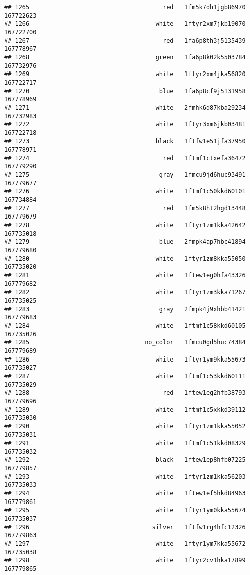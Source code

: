 \documentclass[
]{article}
\begin{document}
\begin{verbatim}
## 1265                                     red   1fm5k7dh1jgb86970 167722623
## 1266                                   white   1ftyr2xm7jkb19070 167722700
## 1267                                     red   1fa6p8th3j5135439 167778967
## 1268                                   green   1fa6p8k02k5503784 167732976
## 1269                                   white   1ftyr2xm4jka56820 167722717
## 1270                                    blue   1fa6p8cf9j5131958 167778969
## 1271                                   white   2fmhk6d87kba29234 167732983
## 1272                                   white   1ftyr3xm6jkb03481 167722718
## 1273                                   black   1ftfw1e51jfa37950 167778971
## 1274                                     red   1ftmf1ctxefa36472 167779290
## 1275                                    gray   1fmcu9jd6huc93491 167779677
## 1276                                   white   1ftmf1c50kkd60101 167734884
## 1277                                     red   1fm5k8ht2hgd13448 167779679
## 1278                                   white   1ftyr1zm1kka42642 167735018
## 1279                                    blue   2fmpk4ap7hbc41894 167779680
## 1280                                   white   1ftyr1zm8kka55050 167735020
## 1281                                   white   1ftew1eg0hfa43326 167779682
## 1282                                   white   1ftyr1zm3kka71267 167735025
## 1283                                    gray   2fmpk4j9xhbb41421 167779683
## 1284                                   white   1ftmf1c58kkd60105 167735026
## 1285                                no_color   1fmcu0gd5huc74384 167779689
## 1286                                   white   1ftyr1ym9kka55673 167735027
## 1287                                   white   1ftmf1c53kkd60111 167735029
## 1288                                     red   1ftew1eg2hfb38793 167779696
## 1289                                   white   1ftmf1c5xkkd39112 167735030
## 1290                                   white   1ftyr1zm1kka55052 167735031
## 1291                                   white   1ftmf1c51kkd08329 167735032
## 1292                                   black   1ftew1ep8hfb07225 167779857
## 1293                                   white   1ftyr1zm1kka56203 167735033
## 1294                                   white   1ftew1ef5hkd84963 167779861
## 1295                                   white   1ftyr1ym0kka55674 167735037
## 1296                                  silver   1ftfw1rg4hfc12326 167779863
## 1297                                   white   1ftyr1ym7kka55672 167735038
## 1298                                   white   1ftyr2cv1hka17899 167779865

\end{verbatim}
\end{document}

